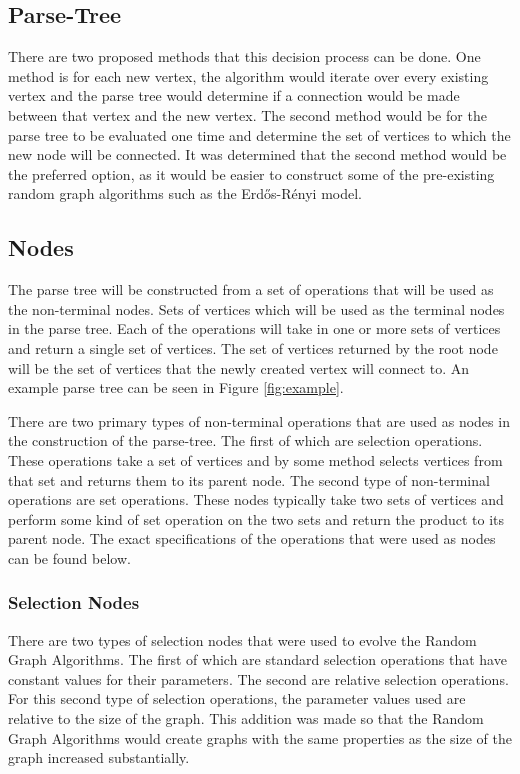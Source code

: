 \documentclass{article}
\begin{document}
\subsection{Parse-Tree}
There are two proposed methods that this decision process can be done. One method is for each new vertex, 
the algorithm would iterate over every existing vertex and the parse tree would determine if a 
connection would be made between that vertex and the new vertex. The second method would be for the parse 
tree to be evaluated one time and determine the set of vertices to which the new node will be connected.  
It was determined that the second method would be the preferred option, as it would be easier to 
construct some of the pre-existing random graph algorithms such as the Erd\H{o}s-R\'{e}nyi model.

\subsection{Nodes}
The parse tree will be constructed from a set of operations that will be used as the non-terminal 
nodes. Sets of vertices which will be used as the terminal nodes in the parse tree.  Each of the operations will take 
in one or more sets of vertices and return a single set of vertices. The set of vertices returned by the 
root node will be the set of vertices that the newly created vertex will connect to. 
An example parse tree can be seen in Figure \ref{fig:example}.

There are two primary types of non-terminal operations that are used as nodes in the construction of the parse-tree. The
first of which are selection operations. These operations take a set of vertices and by some method selects vertices from
that set and returns them to its parent node. The second type of non-terminal operations are set operations. These nodes 
typically take two sets of vertices and perform some kind of set operation on the two sets and return the product to its
parent node. The exact specifications of the operations that were used as nodes can be found below.

\subsubsection{Selection Nodes}
There are two types of selection nodes that were used to evolve the Random Graph Algorithms. The first of which are standard
selection operations that have constant values for their parameters. The second are relative selection operations. For this 
second type of selection operations, the parameter values used are relative to the size of the graph. This addition was made
so that the Random Graph Algorithms would create graphs with the same properties as the size of the graph increased substantially. 
\end{document}
